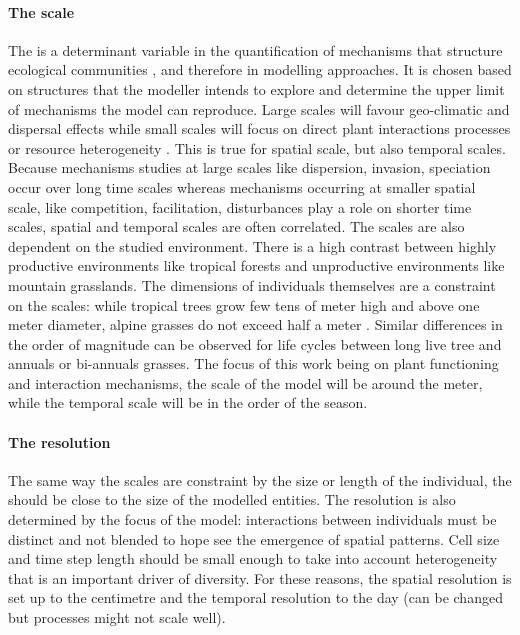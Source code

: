 \paragraph{The scale}
The  is a determinant variable in the quantification of mechanisms that structure ecological communities \parencite{bello_hierarchical_2013}, and therefore in modelling approaches. It is chosen based on structures that the modeller intends to explore and determine the upper limit of mechanisms the model can reproduce. Large scales will favour geo-climatic and dispersal effects \parencite{kleidon_global_2000} while small scales will focus on direct plant interactions processes or resource heterogeneity \parencite{ soussana_gemini:_2012, maire_plasticity_2013, taubert_modelling_2014}. This is true for spatial scale, but also temporal scales. Because mechanisms studies at large scales like dispersion, invasion, speciation occur over long time scales whereas mechanisms occurring at smaller spatial scale, like competition, facilitation, disturbances play a role on shorter time scales, spatial and temporal scales are often correlated. The scales are also dependent on the studied environment. There is a high contrast between highly productive environments like tropical forests and unproductive environments like mountain grasslands. The dimensions of individuals themselves are a constraint on the scales: while tropical trees grow few tens of meter high and above one meter diameter, alpine grasses do not exceed half a meter \parencite{korner_alpine_2003}. Similar differences in the order of magnitude can be observed for life cycles between long live tree and annuals or bi-annuals grasses. The focus of this work being on plant functioning and interaction mechanisms, the scale of the model will be around the meter, while the temporal scale will be in the order of the season.

\paragraph{The resolution} The same way the scales are constraint by the size or length of the individual, the  should be close to the size of the modelled entities. The resolution is also determined by the focus of the model: interactions between individuals must be distinct and not blended to hope see the emergence of spatial patterns. Cell size and time step length should be small enough to take into account heterogeneity that is an important driver of diversity. For these reasons, the spatial resolution is set up to the centimetre and the temporal resolution to the day (can be changed but processes might not scale well).

